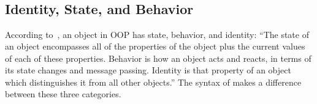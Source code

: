 \begin{figure*}
\begin{multicols}{2}
\begin{tabbing}
 \df {}  \\
 \df {}  \\
  \> \alt \V{(}  \V{)} \\
  \> \alt {} \V{:}  \\
  \> \alt {}  \\
  \> \alt {}   \\
 \df {}  \\
 \df {} \alt {} \alt {} \alt {} \alt {} \\
 \df {}  \alt \V{-{}-} \\
 \df {} \alt {} \\
 \df \RE{[\textbackslash{}dA-F][\textbackslash{}dA-F]} \\
 \df {} \\
 \df {} \\
 \df {}  \\
\end{tabbing}
\end{multicols}
\label{fig:bnf}
\end{figure*}

\subsection{Identity, State, and Behavior}

According to~\citet{grady2007object}, an object in OOP has state, behavior, and identity:
``The state of an object encompasses all of the properties of
the object plus the current values of each of these properties.
Behavior is how an object acts and reacts, in terms of its state changes and message passing.
Identity is that property of an object which distinguishes it from all other objects.''
The syntax of \eo{} makes a difference between these three categories.

